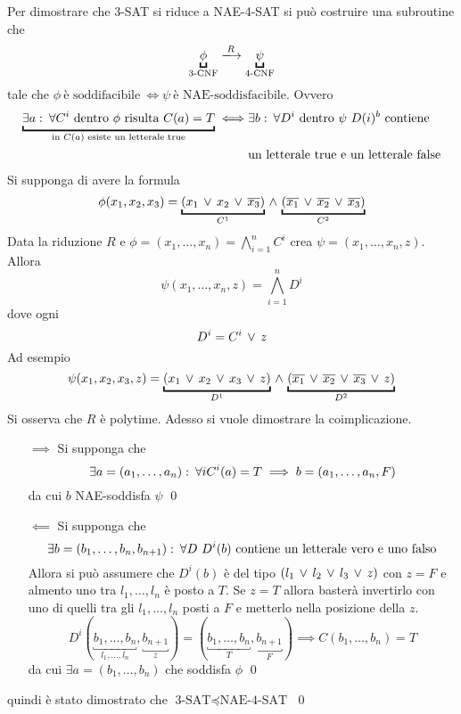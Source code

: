 \begin{demonstration}
	Per dimostrare che 3-SAT si riduce a NAE-4-SAT si può costruire una subroutine che 
	\begin{equation*}
		\underbracket{\phi}_{\text{3-CNF}}\xlongrightarrow{R}\underbracket{\psi}_{\text{4-CNF}}
	\end{equation*}
	tale che $\phi\ \text{è soddifacibile}\ \iff \psi\ \text{è NAE-soddisfacibile}$. Ovvero
	\begin{align*}
		\underbracket{\exists a\tc\forall C^i\ \text{dentro}\ \phi\ \text{risulta}\ C(a)=T}_{\substack{\text{in $C(a)$ esiste un letterale true}}}\iff&\exists b\tc \forall D^i\ \text{dentro}\ \psi\ D(i)^b\ \text{contiene}\\&\text{un letterale true e un letterale false}
	\end{align*}
	Si supponga di avere la formula \[\phi(x_1,x_2,x_3)=\underbracket{(x_1\ve x_2\ve \overline{x_3})}_{C^1}\ive\underbracket{(\overline{x_1}\ve\overline{x_2}\ve \overline{x_3})}_{C^2}\] Data la riduzione $R$ e $\phi=(x_1,\dots,x_n)=\bigwedge_{i=1}^n C^i$ crea $\psi=(x_1,\dots,x_n,z)$. Allora \[\psi(x_1,\dots,x_n,z)=\bigwedge_{i=1}^nD^i\] dove ogni \[D^i=C^i\,\vee\, z\] Ad esempio \[\psi(x_1,x_2,x_3,z)=\underbracket{(x_1\ve x_2\ve x_3\ve z)}_{D^1}\ive\underbracket{(\overline{x_1}\ve\overline{x_2}\ve\overline{x_3}\ve z)}_{D^2}\]
	Si osserva che $R$ è polytime. Adesso si vuole dimostrare la coimplicazione. 
	\begin{itemize}
		\item[$\implies$] Si supponga che \[\exists a=(a_1,\dots,a_n)\,\colon\, \forall i C^i(a)=T\implies b=(a_1,\dots,a_n,F)\] da cui $b$  NAE-soddisfa $\psi$ \qed
		\item[$\impliedby$] Si supponga che \[\exists b=(b_1,\dots,b_n,b_{n+1})\,\colon\, \forall D\ D^i(b)\ \text{contiene un letterale vero e uno falso}\] Allora si può assumere che $D^i(b)$ è del tipo $(l_1\,\vee\, l_2 \,\vee\, l_3\,\vee\, z)$ con $z=F$ e almento uno tra $l_1,\dots,l_n$ è posto a $T$. Se $z=T$ allora basterà invertirlo con uno di quelli tra gli $l_1,\dots,l_n$ posti a $F$ e metterlo nella posizione della $z$. \[D^i(\underbracket{b_1,\dots,b_n}_{l_1,\dots,l_n},\underbracket{b_{n+1}}_z)=(\underbracket{b_1,\dots,b_n}_T,\underbracket{b_{n+1}}_F)\implies C(b_1,\dots,b_n)=T\] da cui $\exists a=(b_1,\dots,b_n)$ che soddisfa $\phi$ \qed 
	\end{itemize}
	quindi è stato dimostrato che $\text{3-SAT}\preceq \text{NAE-4-SAT}$
	\qed
\end{demonstration}

